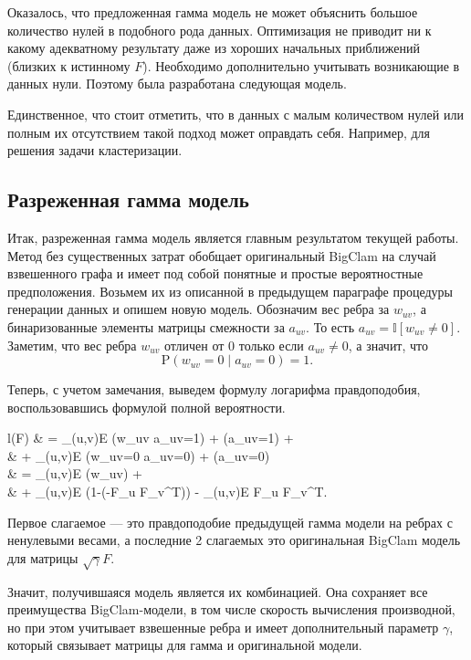 \documentclass{ITaSconf}
\def\PP{\mathrm{P}}
\begin{document}
	Оказалось, что предложенная гамма модель не может объяснить большое количество нулей в подобного рода данных. 
	Оптимизация не приводит ни к какому адекватному результату даже из хороших начальных приближений (близких к истинному $F$).
	Необходимо дополнительно учитывать возникающие в данных нули. Поэтому была разработана следующая модель.
	
	Единственное, что стоит отметить, что в данных с малым количеством нулей или полным их отсутствием такой подход может оправдать себя. 
	Например, для решения задачи кластеризации.
	
	\subsection{Разреженная гамма модель}
	
	Итак, разреженная гамма модель является главным результатом текущей работы. 
	Метод без существенных затрат обобщает оригинальный BigClam на случай взвешенного графа и имеет под собой понятные и простые вероятностные предположения. Возьмем их из описанной в предыдущем параграфе процедуры генерации данных и опишем новую модель. 
	Обозначим вес ребра за $w_{uv}$, а бинаризованные элементы матрицы смежности за $a_{uv}$. То есть $a_{uv} = \mathbb I \left[w_{uv} \ne 0\right]$. Заметим, что вес ребра $w_{uv}$ отличен от 0 только если $a_{uv}\ne0$, а значит, что 
	$$ \PP(w_{uv}=0 \mid a_{uv}=0) = 1.$$
	
	Теперь, с учетом замечания, выведем формулу логарифма правдоподобия, воспользовавшись формулой полной вероятности.
	\begin{flalign*}
	l(F) & = \sum_{(u,v)\in E} \log \PP(w_{uv} \mid a_{uv}=1) + \log \PP(a_{uv}=1) + \\
	& \quad + \sum_{(u,v)\notin E} \log \PP(w_{uv}=0 \mid a_{uv}=0) + \log \PP(a_{uv}=0) \\
	& = \sum_{(u,v)\in E} \log {}(w_{uv}) + \\
	& \quad + \sum_{(u,v)\in E} \log\left(1-\exp\left(-\gamma F_u {F_v}^T\right)\right) - \gamma \sum_{(u,v)\notin E} F_u {F_v}^T.
	\end{flalign*}
	
	Первое слагаемое --- это правдоподобие предыдущей гамма модели на ребрах с ненулевыми весами, а последние 2 слагаемых это оригинальная BigClam модель для матрицы $\sqrt \gamma F$.
	
	Значит, получившаяся модель является их комбинацией. 
	Она сохраняет все преимущества BigClam-модели, в том числе скорость вычисления производной, но при этом учитывает взвешенные ребра и имеет дополнительный параметр $\gamma$, который связывает матрицы для гамма и оригинальной модели.
	
\end{document}
